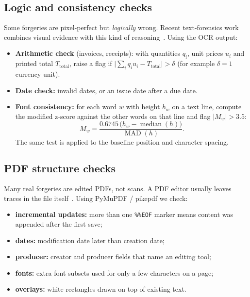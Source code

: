 \documentclass[11pt,a4paper]{article}
\begin{document}
\subsection{Logic and consistency checks}
Some forgeries are pixel-perfect but \emph{logically} wrong. Recent text-forensics work combines
visual evidence with this kind of reasoning~\cite{logiclens}. Using the OCR output:
\begin{itemize}
  \item \textbf{Arithmetic check} (invoices, receipts): with quantities $q_i$, unit prices $u_i$ and
        printed total $T_{\text{total}}$, raise a flag if
        $\bigl\lvert\sum_i q_i u_i-T_{\text{total}}\bigr\rvert>\delta$ (for example $\delta=1$ currency unit).
  \item \textbf{Date check:} invalid dates, or an issue date after a due date.
  \item \textbf{Font consistency:} for each word $w$ with height $h_w$ on a text line, compute the
        modified z-score against the other words on that line and flag $\lvert M_w\rvert>3.5$:
        \begin{equation}
          M_w=\frac{0.6745\,\bigl(h_w-\operatorname{median}(h)\bigr)}{\operatorname{MAD}(h)} .
          \label{eq:modz}
        \end{equation}
        The same test is applied to the baseline position and character spacing.
\end{itemize}

\subsection{PDF structure checks}
\label{sec:pdfchecks}
Many real forgeries are edited PDFs, not scans. A PDF editor usually leaves traces in the file
itself~\cite{pdftamper}. Using PyMuPDF / pikepdf we check:
\begin{itemize}
  \item \textbf{incremental updates:} more than one \texttt{\%\%EOF} marker means content was appended after the first save;
  \item \textbf{dates:} modification date later than creation date;
  \item \textbf{producer:} creator and producer fields that name an editing tool;
  \item \textbf{fonts:} extra font subsets used for only a few characters on a page;
  \item \textbf{overlays:} white rectangles drawn on top of existing text.
\end{itemize}
\end{document}

